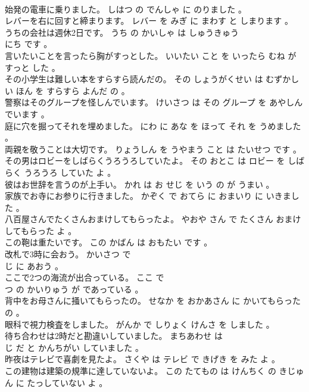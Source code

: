 \documentclass[8pt]{extreport}
\begin{document}
\begin{CJK}{UTF8}{min}
\\	始発の電車に乗りました。	しはつ の でんしゃ に のりました 。 
\\	レバーを右に回すと締まります。	レバー を みぎ に まわす と しまります 。 
\\	うちの会社は週休2日です。	うち の かいしゃ は しゅうきゅう 
\\	にち です 。 
\\	言いたいことを言ったら胸がすっとした。	いいたい こと を いったら むね が すっと した 。 
\\	その小学生は難しい本をすらすら読んだの。	その しょうがくせい は むずかしい ほん を すらすら よんだ の 。 
\\	警察はそのグループを怪しんでいます。	けいさつ は その グループ を あやしん でいます 。 
\\	庭に穴を掘ってそれを埋めました。	にわ に あな を ほって それ を うめました 。 
\\	両親を敬うことは大切です。	りょうしん を うやまう こと は たいせつ です 。 
\\	その男はロビーをしばらくうろうろしていたよ。	その おとこ は ロビー を しばらく うろうろ していた よ 。 
\\	彼はお世辞を言うのが上手い。	かれ は お せじ を いう の が うまい 。 
\\	家族でお寺にお参りに行きました。	かぞく で おてら に おまいり に いきました 。 
\\	八百屋さんでたくさんおまけしてもらったよ。	やおや さん で たくさん おまけ してもらった よ 。 
\\	この鞄は重たいです。	この かばん は おもたい です 。 
\\	改札で3時に会おう。	かいさつ で 
\\	じ に あおう 。 
\\	ここで2つの海流が出合っている。	ここ で 
\\	つ の かいりゅう が であっている 。 
\\	背中をお母さんに掻いてもらったの。	せなか を おかあさん に かいてもらった の 。 
\\	眼科で視力検査をしました。	がんか で しりょく けんさ を しました 。 
\\	待ち合わせは2時だと勘違いしていました。	まちあわせ は 
\\	じ だ と かんちがい していました 。 
\\	昨夜はテレビで喜劇を見たよ。	さくや は テレビ で きげき を みた よ 。 
\\	この建物は建築の規準に達していないよ。	この たてもの は けんちく の きじゅん に たっしていない よ 。 

\end{CJK}
\end{document}
